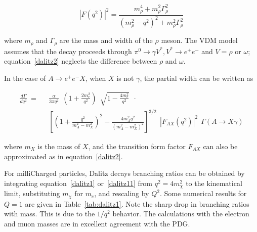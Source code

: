 \documentclass[12pt]{article}
\begin{document}
\begin{equation}
  |F(q^2)|^2 = \frac{m^4_\rho + m^2_\rho \Gamma^2_\rho}{(m_\rho^2 - q^2)^2 + m^2_\rho \Gamma^2_\rho}
  \label{dalitz2}
\end{equation}

\noindent where $m_\rho$ and $\Gamma_\rho$ are the mass and width of the
$\rho$ meson.  The VDM model assumes that the decay proceeds through
$\pi^0 \to \gamma V^*, V^* \to e^+e^-$ and $V= \rho$ or $\omega$;
equation~\ref{dalitz2} neglects the difference between $\rho$ and $\omega$.

In the case of $A \to e^+ e^- X$, when $X$ is not $\gamma$, the
partial width can be written as 

\begin{equation}
\begin{split}
\frac{d \Gamma}{d q^2}  ~=~~~ & \frac{\alpha}{3 \pi q^2}~~
(1+\frac{2m_e^2}{q^2})~~\sqrt{1 - \frac{4m_e^2}{q^2}}~~ \cdot \\
& \left [ (1+\frac{q^2}{m_A^2-m_X^2})^2 - \frac{4
    m_A^2q^2}{(m_A^2-m_X^2)^2}\right ]^{3/2}~~
|F_{AX}(q^2)|^2 ~~
\Gamma(A \to X \gamma) 
\label{dalitz11}
\end{split}
\end{equation}

\noindent where $m_X$ is the mass of $X$, and the
transition
form factor $F_{AX}$ can also be approximated as in equation~\ref{dalitz2}.

For milliCharged particles, Dalitz decays branching ratios 
can be obtained by integrating equation~\ref{dalitz1} or~\ref{dalitz11}
from 
$q^2=4m^2_\chi$ to the kinematical limit, substituting $m_\chi$ for 
$m_e$, and rescaling by $Q^2$.
Some numerical results for $Q=1$ are given in Table~\ref{tab:dalitz1}.  Note the
sharp drop in branching ratios with mass.  This is due to the $1/q^2$ behavior.
The calculations
with the electron and muon masses are in excellent agreement with the PDG.
\end{document}
